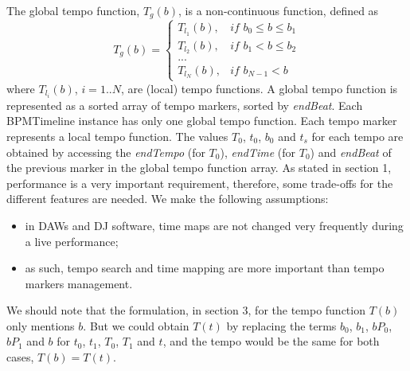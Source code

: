 \documentclass{sig-alternate}
\begin{document}
The global tempo function, $T_{g}(b)$, is a non-continuous function, defined as 
\begin{displaymath}
T_{g}(b) = \left\{\begin{array}{lll}
	T_{l_1}(b), & if\,\,b_0 \leq b \leq b_1\\
	T_{l_2}(b), & if\,\,b_1 < b \leq b_2\\
	...\\
	T_{l_N}(b), & if\,\,b_{N-1} < b 
            \end{array}\right.
\end{displaymath}
where $T_{l_i}(b)$, $i=1..N$, are (local) tempo functions. A global tempo function is represented as a sorted array of tempo markers, sorted by \textit{endBeat}. Each BPMTimeline instance has only one global tempo function. Each tempo marker represents a local tempo function. The values $T_0$, $t_0$, $b_0$ and $t_s$ for each tempo are obtained by accessing the \textit{endTempo} (for $T_0$), \textit{endTime} (for $T_0$) and \textit{endBeat} of the previous marker in the global tempo function array.
As stated in section 1, performance is a very important requirement, therefore, some trade-offs for the different features are needed. We make the following assumptions: 
\begin{itemize}
	\item in DAWs and DJ software, time maps are not changed very frequently during a live performance;
	\item as such, tempo search and time mapping are more important than tempo markers management.
\end{itemize}
We should note that the formulation, in section 3, for the tempo function $T(b)$ only mentions $b$. But we could obtain $T(t)$ by replacing the terms $b_0$, $b_1$, $bP_0$, $bP_1$ and $b$ for $t_0$, $t_1$, $T_0$, $T_1$ and $t$, and the tempo would be the same for both cases, $T(b) = T(t)$.	
\end{document}
